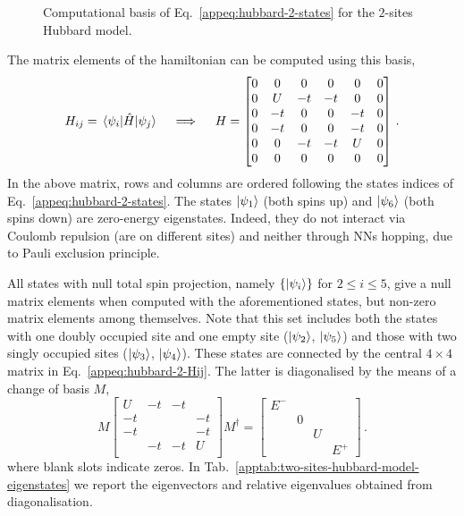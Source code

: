 \begin{figure}
	\centering
	
	\caption{Computational basis of Eq.~\eqref{appeq:hubbard-2-states} for the $2$-sites Hubbard model.}
	\label{appfig:two-sites-hubbard-model}
\end{figure}

The matrix elements of the hamiltonian can be computed using this basis,
\begin{equation}\label{appeq:hubbard-2-Hij}
	H_{ij} = \mel{\psi_i}{\hat H}{\psi_j}
	\quad\implies\quad
	H = \begin{bmatrix}
		0 &  0 &  0 &  0 &  0 &  0 \\
		0 &  U & -t & -t &  0 &  0 \\
		0 & -t &  0 &  0 & -t &  0 \\
		0 & -t &  0 &  0 & -t &  0 \\
		0 &  0 & -t & -t &  U &  0 \\
		0 &  0 &  0 &  0 &  0 &  0 \\  
	\end{bmatrix} \, .
\end{equation}
In the above matrix, rows and columns are ordered following the states indices of Eq.~\eqref{appeq:hubbard-2-states}. The states $\ket{\psi_1}$ (both spins up) and $\ket{\psi_6}$ (both spins down) are zero-energy eigenstates. Indeed, they do not interact via Coulomb repulsion (are on different sites) and neither through NNs hopping, due to Pauli exclusion principle.

All states with null total spin projection, namely $\lbrace \ket{\psi_i} \rbrace$ for $2 \le i \le 5$, give a null matrix elements when computed with the aforementioned states, but non-zero matrix elements among themselves. Note that this set includes both the states with one doubly occupied site and one empty site ($\ket{\psi_2}$, $\ket{\psi_5}$) and those with two singly occupied sites ($\ket{\psi_3}$, $\ket{\psi_4}$). These states are connected by the central $4 \times 4$ matrix in Eq.~\eqref{appeq:hubbard-2-Hij}. The latter is diagonalised by the means of a change of basis $M$,
\[
	M \begin{bmatrix}
		 U & -t & -t &     \\
		-t &    &    & -t  \\
		-t &    &    & -t  \\
		   & -t & -t &  U  \\
	\end{bmatrix} M^\dagger = \begin{bmatrix}
	E^- &   & 	& 	 \\
	    & 0 & 	&	 \\
		&   & U & 	 \\
		&	&	& E^+
	\end{bmatrix} \, .
\]
where blank slots indicate zeros. In
Tab.~\ref{apptab:two-sites-hubbard-model-eigenstates} we report the eigenvectors and relative eigenvalues obtained from diagonalisation. 


